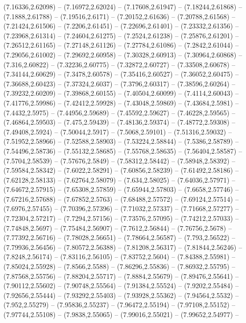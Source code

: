 {(7.16336,2.62098) -- (7.16972,2.62024) -- (7.17608,2.61947) -- (7.18244,2.61868) -- (7.1888,2.61788) -- (7.19516,2.6171) -- (7.20152,2.61636) -- (7.20788,2.61568) -- (7.21424,2.61506) -- (7.2206,2.61451) -- (7.22696,2.61401) -- (7.23332,2.61356) --
(7.23968,2.61314) -- (7.24604,2.61275) -- (7.2524,2.61238) -- (7.25876,2.61201) -- (7.26512,2.61165) -- (7.27148,2.61126) -- (7.27784,2.61086) -- (7.2842,2.61044) -- (7.29056,2.61002) -- (7.29692,2.60958) -- (7.30328,2.60913) -- (7.30964,2.60868) --
(7.316,2.60822) -- (7.32236,2.60775) -- (7.32872,2.60727) -- (7.33508,2.60678) -- (7.34144,2.60629) -- (7.3478,2.60578) -- (7.35416,2.60527) -- (7.36052,2.60475) -- (7.36688,2.60423) -- (7.37324,2.6037) -- (7.3796,2.60317) -- (7.38596,2.60264) --
(7.39232,2.60209) -- (7.39868,2.60155) -- (7.40504,2.60099) -- (7.4114,2.60043) -- (7.41776,2.59986) -- (7.42412,2.59928) -- (7.43048,2.59869) -- (7.43684,2.5981) -- (7.4432,2.5975) -- (7.44956,2.59689) -- (7.45592,2.59627) -- (7.46228,2.59565) --
(7.46864,2.59503) -- (7.475,2.59439) -- (7.48136,2.59374) -- (7.48772,2.59308) -- (7.49408,2.5924) -- (7.50044,2.5917) -- (7.5068,2.59101) -- (7.51316,2.59032) -- (7.51952,2.58966) -- (7.52588,2.58903) -- (7.53224,2.58844) -- (7.5386,2.58789) --
(7.54496,2.58736) -- (7.55132,2.58685) -- (7.55768,2.58635) -- (7.56404,2.58587) -- (7.5704,2.58539) -- (7.57676,2.5849) -- (7.58312,2.58442) -- (7.58948,2.58392) -- (7.59584,2.58342) -- (7.6022,2.58291) -- (7.60856,2.58239) -- (7.61492,2.58186) --
(7.62128,2.58133) -- (7.62764,2.58079) -- (7.634,2.58025) -- (7.64036,2.57971) -- (7.64672,2.57915) -- (7.65308,2.57859) -- (7.65944,2.57803) -- (7.6658,2.57746) -- (7.67216,2.57688) -- (7.67852,2.5763) -- (7.68488,2.57572) -- (7.69124,2.57514) --
(7.6976,2.57455) -- (7.70396,2.57396) -- (7.71032,2.57337) -- (7.71668,2.57277) -- (7.72304,2.57217) -- (7.7294,2.57156) -- (7.73576,2.57095) -- (7.74212,2.57033) -- (7.74848,2.5697) -- (7.75484,2.56907) -- (7.7612,2.56844) -- (7.76756,2.5678) --
(7.77392,2.56716) -- (7.78028,2.56651) -- (7.78664,2.56587) -- (7.793,2.56522) -- (7.79936,2.56456) -- (7.80572,2.56388) -- (7.81208,2.56317) -- (7.81844,2.56246) -- (7.8248,2.56174) -- (7.83116,2.56105) -- (7.83752,2.5604) -- (7.84388,2.55981) --
(7.85024,2.55928) -- (7.8566,2.5588) -- (7.86296,2.55836) -- (7.86932,2.55795) -- (7.87568,2.55756) -- (7.88204,2.55717) -- (7.8884,2.55679) -- (7.89476,2.55641) -- (7.90112,2.55602) -- (7.90748,2.55564) -- (7.91384,2.55524) -- (7.9202,2.55484) --
(7.92656,2.55444) -- (7.93292,2.55403) -- (7.93928,2.55362) -- (7.94564,2.5532) -- (7.952,2.55279) -- (7.95836,2.55237) -- (7.96472,2.55194) -- (7.97108,2.55152) -- (7.97744,2.55108) -- (7.9838,2.55065) -- (7.99016,2.55021) -- (7.99652,2.54977) --
}
